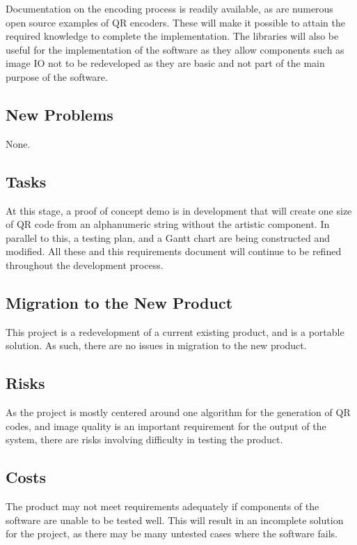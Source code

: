 \documentclass[12pt, titlepage]{article}
\begin{document}
	Documentation on the encoding process is readily available, as are numerous 
	open source examples of QR encoders. These will make it possible to attain 
	the required knowledge to complete the implementation. The libraries will 
	also be useful for the implementation of the software as they allow 
	components such as image IO not to be redeveloped as they are basic and not 
	part of the main purpose of the software.

\subsection{New Problems}

	None.

\subsection{Tasks}

	At this stage, a proof of concept demo is in development that will create 
	one size of QR code from an alphanumeric string without the artistic 
	component. In parallel to this, a testing plan, and a Gantt chart are being 
	constructed and modified. All these and this requirements document will 
	continue to be refined throughout the development process.

\subsection{Migration to the New Product}

	This project is a redevelopment of a current existing product, and is a 
	portable solution. As such, there are no issues in migration to the new 
	product.

\subsection{Risks}

	As the project is mostly centered around one algorithm for the generation 
	of QR codes, and image quality is an important requirement for the output 
	of the system, there are risks involving difficulty in testing the product. 

\subsection{Costs}

	The product may not meet requirements adequately if components of the 
	software are unable to be tested well. This will result in an incomplete 
	solution for the project, as there may be many untested cases where the 
	software fails.
\end{document}
